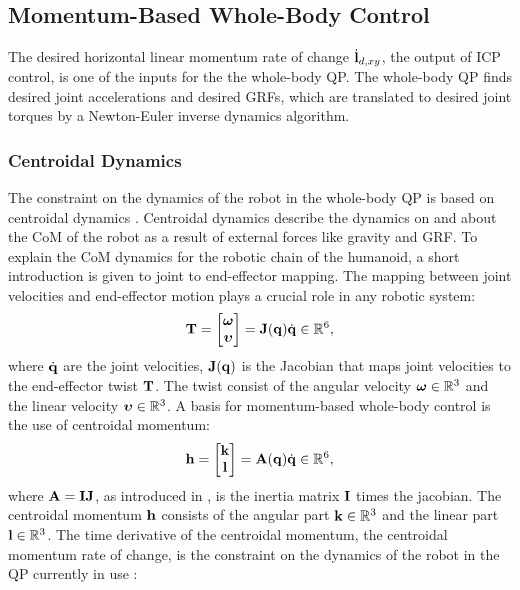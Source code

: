 \subsection{Momentum-Based Whole-Body Control}
The desired horizontal linear momentum rate of change $\dot{\mathbf{l}}_{d,xy}$, the output of \ac{ICP} control, is one of the inputs for the the whole-body \ac{QP}. The whole-body \ac{QP} finds desired joint accelerations and desired \ac{GRF}s, which are translated to desired joint torques by a Newton-Euler inverse dynamics algorithm.

\subsubsection{Centroidal Dynamics}
The constraint on the dynamics of the robot in the whole-body \ac{QP} is based on centroidal dynamics \cite{orin2013centroidal}. Centroidal dynamics describe the dynamics on and about the \ac{CoM} of the robot as a result of external forces like gravity and \ac{GRF}. To explain the \ac{CoM} dynamics for the robotic chain of the humanoid, a short introduction is given to joint to end-effector mapping. The mapping between joint velocities and end-effector motion plays a crucial role in any robotic system:
\begin{equation}\label{eq:jacobian}
\mathbf{T}=\begin{bmatrix}\boldsymbol{\omega} \\ \boldsymbol{\upsilon} \end{bmatrix} = \mathbf{J}(\mathbf{q})\dot{\mathbf{q}} \in \mathbb{R}^6,
\end{equation}
where $\dot{\mathbf{q}}$ are the joint velocities, $\mathbf{J}(\mathbf{q})$ is the Jacobian that maps joint velocities to the end-effector twist $\mathbf{T}$. The twist consist of the angular velocity $\boldsymbol{\omega} \in \mathbb{R}^3$ and the linear velocity $\boldsymbol{\upsilon} \in \mathbb{R}^3$. A basis for momentum-based whole-body control is the use of centroidal momentum:
\begin{equation}
\mathbf{h}=\begin{bmatrix}\mathbf{k} \\ \mathbf{l} \end{bmatrix} =\mathbf{A}(\mathbf{q})\dot{\mathbf{q}} \in \mathbb{R}^6,
\end{equation}
 where $\mathbf{A}=\mathbf{I}\mathbf{J}$, as introduced in \cite{orin2013centroidal},  is the inertia matrix $\mathbf{I}$ times the jacobian. The centroidal momentum $\mathbf{h}$ consists of the angular part $\mathbf{k} \in \mathbb{R}^3$ and the linear part $\mathbf{l} \in \mathbb{R}^3$. The time derivative of the centroidal momentum, the centroidal momentum rate of change, is the constraint on the dynamics of the robot in the \ac{QP} currently in use \cite{koolen2016design}:
